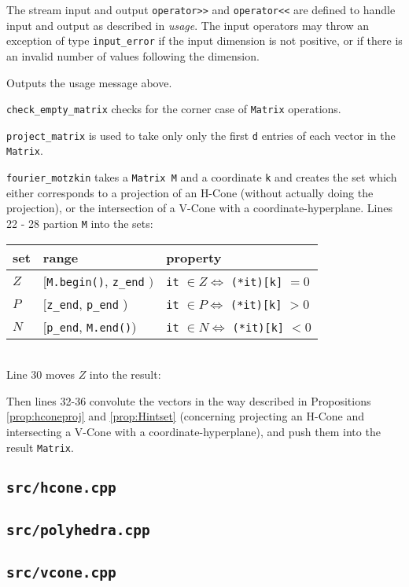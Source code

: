 \documentclass[fleqn]{article}
\newcommand{\0}{\vec{0}}
\begin{document}
 
The stream input and output \lstinline{operator>>} and \lstinline{operator<<} are defined to handle input and output as described in \textit{usage}.  The input operators may throw an exception of type \lstinline{input_error} if the input dimension is not positive, or if there is an invalid number of values following the dimension.

 
Outputs the usage message above.

 
\lstinline{check_empty_matrix} checks for the corner case of \lstinline{Matrix} operations.

 
\lstinline{project_matrix} is used to take only only the first \lstinline{d} entries of each vector in the \lstinline{Matrix}.

 
\lstinline{fourier_motzkin} takes a \lstinline{Matrix M} and a coordinate \lstinline{k} and creates the set which either corresponds to a projection of an H-Cone (without actually doing the projection), or the intersection of a V-Cone with a coordinate-hyperplane.  Lines 22 - 28 partion \lstinline{M} into the sets:\\

\begin{tabular}{|l|l|l|}
  \hline
set & range & property \\
  \hline
  $Z$ & [\lstinline|M.begin()|, \lstinline|z_end| $)$ & 
      \lstinline|it| $\in Z \Leftrightarrow$ \lstinline|(*it)[k]| $ = 0$ \\
  \hline
  $P$ & [\lstinline|z_end|, \lstinline|p_end| ) & 
      \lstinline|it| $\in P \Leftrightarrow$ \lstinline|(*it)[k]| $ > 0$ \\
  \hline
  $N$ & [\lstinline|p_end|, \lstinline|M.end()|) & 
      \lstinline|it| $\in N \Leftrightarrow$ \lstinline|(*it)[k]| $ < 0$ \\
  \hline
\end{tabular}\\

Line 30 moves $Z$ into the result:


Then lines 32-36 convolute the vectors in the way described in Propositions \ref{prop:hconeproj} and \ref{prop:Hintset} (concerning projecting an H-Cone and intersecting a V-Cone with a coordinate-hyperplane), and push them into the result \lstinline{Matrix}.\\

\subsection{\texttt{src/hcone.cpp}}
\subsection{\texttt{src/polyhedra.cpp}}
\subsection{\texttt{src/vcone.cpp}}
\end{document}
